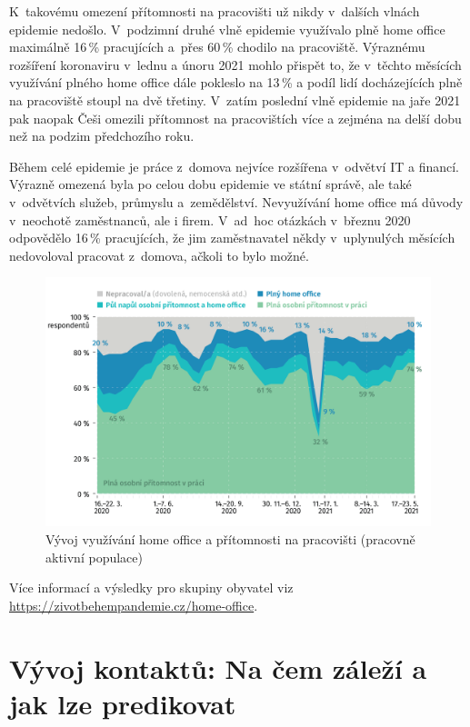 K takovému omezení přítomnosti na pracovišti už nikdy v dalších vlnách epidemie nedošlo. V~podzimní druhé vlně epidemie využívalo plně home office maximálně 16\,\% pracujících a přes 60\,\% chodilo na pracoviště. Výraznému rozšíření koronaviru v lednu a únoru 2021 mohlo přispět to, že v těchto měsících využívání plného home office dále pokleslo na 13\,\% a podíl lidí docházejících plně na pracoviště stoupl na dvě třetiny. V zatím poslední vlně epidemie na jaře 2021 pak naopak Češi omezili přítomnost na pracovištích více a zejména na delší dobu než na podzim předchozího roku.

Během celé epidemie je práce z domova nejvíce rozšířena v odvětví IT a financí. Výrazně omezená byla po celou dobu epidemie ve státní správě, ale také v odvětvích služeb, průmyslu a zemědělství. Nevyužívání home office má důvody v neochotě zaměstnanců, ale i firem. V ad hoc otázkách v březnu 2020 odpovědělo 16\,\% pracujících, že jim zaměstnavatel někdy v uplynulých měsících nedovoloval pracovat z domova, ačkoli to bylo možné.

\begin{figure}[ht]
    \centering
    \includegraphics[width=\textwidth]{./pic/zbp-graf4.png}
    \caption{Vývoj využívání home office a přítomnosti na pracovišti (pracovně aktivní populace)}
    \label{fig:zbp4}
\end{figure}

Více informací a výsledky pro skupiny obyvatel viz \url{https://zivotbehempandemie.cz/home-office}.

\section*{Vývoj kontaktů: Na čem záleží a jak lze predikovat}

